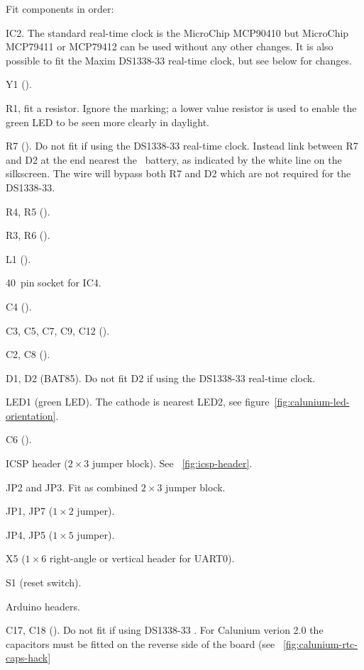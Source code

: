 Fit components in order:
\begin{buildorder}
\item IC2. The standard real-time clock is the MicroChip MCP90410 but
  MicroChip MCP79411 or MCP79412 can be used without any other
  changes.
  It is also possible to fit the Maxim DS1338-33 real-time clock,
  but see below for changes.
\item Y1 ().
\item R1, fit a  resistor. Ignore the  marking; a
  lower value resistor is used to enable the green LED to be seen
  more clearly in daylight.
\item R7 (). Do not fit if using the DS1338-33 real-time
  clock. Instead link between R7 and D2 at the end nearest the \rtc\
  battery, as indicated by the white line on the silkscreen. The wire
  will bypass both R7 and D2 which are not required for the DS1338-33.
\item R4, R5 (\kohm{4.7}).
\item R3, R6 ().
\item L1 ().
\item 40~pin socket for IC4.
\item C4 ().
\item C3, C5, C7, C9, C12 ().
\item C2, C8 ().
\item D1, D2 (BAT85). Do not fit D2 if using the DS1338-33 real-time clock.
\item LED1 (green LED). The cathode is nearest LED2, see
  figure~\ref{fig:calunium-led-orientation}.
\item C6 ().
\item ICSP header ($2 \times 3$ jumper block). See
  \figurename~\ref{fig:icsp-header}.
\item JP2 and JP3. Fit as combined $2 \times 3$ jumper block.
\item JP1, JP7 ($1 \times 2$ jumper).
\item JP4, JP5 ($1 \times 5$ jumper).
\item X5 ($1 \times 6$ right-angle or vertical header for UART0).
\item S1 (reset switch).
\item Arduino headers. 
\item C17, C18 (). Do not fit if using DS1338-33 \rtc. For
  Calunium verion 2.0 the capacitors must be fitted on the reverse
  side of the board (see \figurename~\ref{fig:calunium-rtc-caps-hack}

\end{buildorder}
